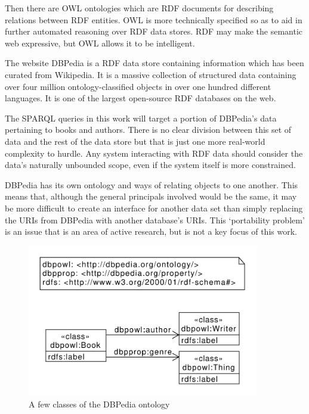 \documentclass[11pt]{article}
\begin{document}
Then there are OWL ontologies which are RDF documents for describing relations
between RDF entities\cite{owl}. OWL is more technically specified so as to
aid in further automated reasoning
over RDF data stores. RDF may make the semantic web expressive, but OWL
allows it to be intelligent.

The website DBPedia\cite{dbpedia,dbpedia-swj} is a RDF data store containing information 
which has been curated from Wikipedia. It is a massive collection of structured data
containing over four million ontology-classified objects in over one hundred different
languages. It is one of the largest open-source RDF databases on the web.

The SPARQL queries in this work will target a portion of DBPedia's
data pertaining to books and authors. There is no clear division between this set of
data and the rest of the data store but that is just one more real-world complexity
to hurdle. Any system interacting with RDF data should consider
the data's naturally unbounded scope, even if the system itself is more constrained.

DBPedia has its own ontology and ways of relating objects to one another. This means
that, although the general principals involved would be the same, 
it may be more difficult to create an interface for another data set than simply 
replacing the URIs from DBPedia with another database's URIs. This `portability problem'
is an issue that is an area of active research\cite{issues, usability}, 
but is not a key focus of this work.

\begin{figure}[h!]
    \centering
    \includegraphics[width=0.9\textwidth,natwidth=1,natheight=1]{umlet/book_ontology.pdf}
    \caption{A few classes of the DBPedia ontology}
    \label{fig:book_ontology}
\end{figure}
\end{document}
